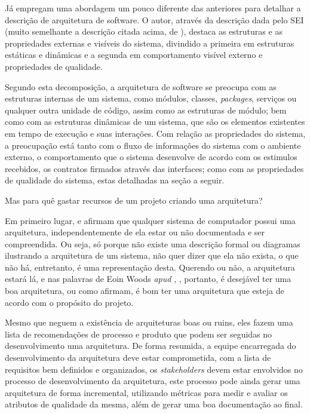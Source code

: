 \documentclass[diss]{template/setrem}
\begin{document}
Já \citet{Rozanski2005} empregam uma abordagem um pouco diferente das anteriores para detalhar a descrição de arquitetura de software. O autor, através da descrição dada pelo SEI (muito semelhante a descrição citada acima, de \citet{Bass2003}), destaca as estruturas e as propriedades externas e visíveis do sistema, divindido a primeira em estruturas estáticas e dinâmicas e a segunda em comportamento visível externo e propriedades de qualidade. 

Segundo esta decomposição, a arquitetura de software se preocupa com as estruturas internas de um sistema, como módulos, classes, \emph{packages}, serviços ou qualquer outra unidade de código, assim como as estruturas de módulo; bem como com as estruturas dinâmicas de um sistema, que são os elementos existentes em tempo de execução e suas interações. Com relação as propriedades do sistema, a preocupação está tanto com o fluxo de informações do sistema com o ambiente externo, o comportamento que o sistema desenvolve de acordo com os estimulos recebidos, os contratos firmados através das interfaces; como com as propriedades de qualidade do sistema, estas detalhadas na seção a seguir.

Mas para quê gastar recursos de um projeto criando uma arquitetura?

Em primeiro lugar, \citet{Rozanski2005} e \citet{Bass2003} afirmam que qualquer sistema de computador possui uma arquitetura, independentemente de ela estar ou não documentada e ser compreendida. Ou seja, só porque não existe uma descrição formal ou diagramas ilustrando a arquitetura de um sistema, não quer dizer que ela não exista, o que não há, entretanto, é uma representação desta. Querendo ou não, a arquitetura estará lá, e nas palavras de Eoin Woods \emph{apud} \citet[p. 11]{Gorton2011}, , portanto, é desejável ter uma boa arquitetura, ou como \citet{Bass2003} afirmam, é bom ter uma arquitetura que esteja de acordo com o propósito do projeto.

Mesmo que \citet{Bass2003} neguem a existência de arquiteturas boas ou ruins, eles fazem uma lista de recomendações de processo e produto que podem ser seguidas no desenvolvimento uma arquitetura. De forma resumida, a equipe encarregada do desenvolvimento da arquitetura deve estar comprometida, com a lista de requisitos bem definidos e organizados, os \emph{stakeholders} devem estar envolvidos no processo de desenvolvimento da arquitetura, este processo pode ainda gerar uma arquitetura de forma incremental, utilizando métricas para medir e avaliar os atributos de qualidade da mesma, além de gerar uma boa documentação ao final.
\end{document}
